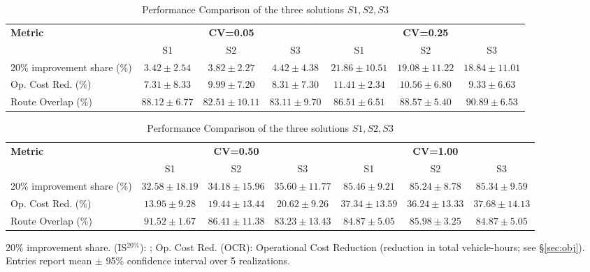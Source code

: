 \documentclass[a4paper,fleqn]{cas-sc}
\begin{document}
\begin{table}
\centering
\scriptsize
\setlength{\tabcolsep}{2.5pt}
\begin{threeparttable}

\begin{tabular}{lcccccc}
\toprule
\textbf{Metric} 
  & \multicolumn{3}{c}{\textbf{CV=0.05}} 
  & \multicolumn{3}{c}{\textbf{CV=0.25}} \\
\cmidrule(lr){2-4} \cmidrule(lr){5-7}
& S1 & S2 & S3 & S1 & S2 & S3 \\
\midrule
20\% improvement share (\%) 
  & $3.42\pm2.54$ & $3.82\pm2.27$ & $4.42\pm4.38$ 
  & $21.86\pm10.51$ & $19.08\pm11.22$ & $18.84\pm11.01$ \\
Op. Cost Red. (\%) 
  & $7.31\pm8.33$ & $9.99\pm7.20$ & $8.31\pm7.30$ 
  & $11.41\pm2.34$ & $10.56\pm6.80$ & $9.33\pm6.63$ \\
Route Overlap (\%) 
  & $88.12\pm6.77$ & $82.51\pm10.11$ & $83.11\pm9.70$ 
  & $86.51\pm6.51$ & $88.57\pm5.40$ & $90.89\pm6.53$ \\
\bottomrule
\end{tabular}

\vspace{0.5em}

\begin{tabular}{lcccccc}
\toprule
\textbf{Metric} 
  & \multicolumn{3}{c}{\textbf{CV=0.50}} 
  & \multicolumn{3}{c}{\textbf{CV=1.00}} \\
\cmidrule(lr){2-4} \cmidrule(lr){5-7}
& S1 & S2 & S3 & S1 & S2 & S3 \\
\midrule
20\% improvement share (\%) 
  & $32.58\pm18.19$ & $34.18\pm15.96$ & $35.60\pm11.77$ 
  & $85.46\pm9.21$ & $85.24\pm8.78$ & $85.34\pm9.59$ \\
Op. Cost Red. (\%) 
  & $13.95\pm9.28$ & $19.44\pm13.44$ & $20.62\pm9.26$ 
  & $37.34\pm13.59$ & $36.24\pm13.33$ & $37.68\pm14.13$ \\
Route Overlap (\%) 
  & $91.52\pm1.67$ & $86.41\pm11.38$ & $83.23\pm13.43$ 
  & $84.87\pm5.05$ & $85.98\pm3.25$ & $84.87\pm5.05$ \\
\bottomrule
\end{tabular}

\begin{tablenotes}
\item 20\% improvement share. (IS$^{20\%}$): ;
Op. Cost Red. (OCR): Operational Cost Reduction (reduction in total vehicle-hours; see \S\ref{sec:obj}).
Entries report mean $\pm$ 95\% confidence interval over 5 realizations.
\end{tablenotes}

\end{threeparttable}
\caption{Performance Comparison of the three solutions $S1, S2, S3$}
\label{tab:perfS123}
\end{table}
\end{document}
